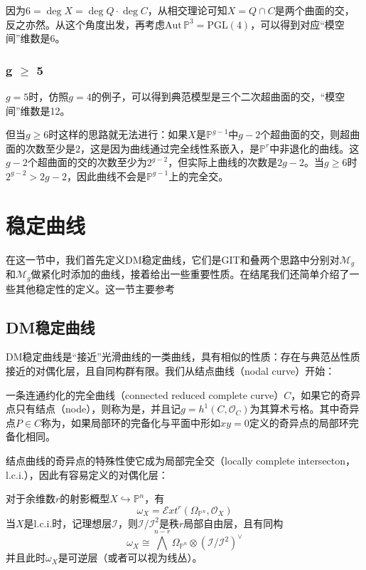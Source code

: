 因为$ 6=\deg X=\deg Q\cdot \deg C$，从相交理论可知$ X=Q\cap C $是两个曲面的交，反之亦然。从这个角度出发，再考虑$ \mathrm{Aut}\, \mathbb{P}^3=\mathrm{PGL}(4) $，可以得到对应“模空间”维数是6。


\subsubsection{g $\geqslant$ 5}
$ g=5 $时，仿照$ g=4 $的例子，可以得到典范模型是三个二次超曲面的交，“模空间”维数是12。

但当$ g\geqslant 6 $时这样的思路就无法进行：如果$ X $是$ \mathbb{P}^{g-1} $中$ g-2 $个超曲面的交，则超曲面的次数至少是$ 2 $，这是因为曲线通过完全线性系嵌入，是$ \mathbb{P}^r $中非退化的曲线。这$ g-2 $个超曲面的交的次数至少为$ 2^{g-2} $，但实际上曲线的次数是$ 2g-2 $。当$ g\geqslant6 $时$ 2^{g-2} > 2g-2$，因此曲线不会是$ \mathbb{P}^{g-1} $上的完全交。


\section{稳定曲线}
在这一节中，我们首先定义DM稳定曲线，它们是GIT和叠两个思路中分别对$ \mathcal{M}_g $和$ \mathscr{M}_g $做紧化时添加的曲线，接着给出一些重要性质。在结尾我们还简单介绍了一些其他稳定性的定义。这一节主要参考\cite{DM69,StabilityofProjectiveVarieties,ModuliofCurves}
\subsection{DM稳定曲线}
DM稳定曲线是“接近”光滑曲线的一类曲线，具有相似的性质：存在与典范丛性质接近的对偶化层，且自同构群有限。我们从结点曲线（nodal curve）开始：
\begin{definition}
	一条连通约化的完全曲线（connected reduced complete curve）$ C $，如果它的奇异点只有结点（node），则称为是，并且记$ g=h^1(C,\mathscr{O}_C) $为其算术亏格。其中奇异点$ P\in C $称为，如果局部环的完备化与平面中形如$ xy=0 $定义的奇异点的局部环完备化相同。
\end{definition}

结点曲线的奇异点的特殊性使它成为局部完全交（locally complete intersecton， l.c.i.），因此有容易定义的对偶化层：
\begin{proposition}[\cite{GTM52}\uppercase\expandafter{\romannumeral3}.Theorem7.11]
	对于余维数$ r $的射影概型$ X\hookrightarrow \mathbb{P}^n $，有
	$$ \omega_X=\mathscr{E}\!xt^r(\Omega_{\mathbb{P}^n},\mathscr{O}_X) $$
	当$ X $是l.c.i.时，记理想层$ \mathscr{I} $，则$ \mathscr{I}/\mathscr{I}^2 $是秩$ r $局部自由层，且有同构
	$$ \omega_X\cong \bigwedge^{n-r}\Omega_{\mathbb{P}^n}\otimes (\mathscr{I}/\mathscr{I}^2)^\vee $$
	并且此时$ \omega_X $是可逆层（或者可以视为线丛）。
\end{proposition}

